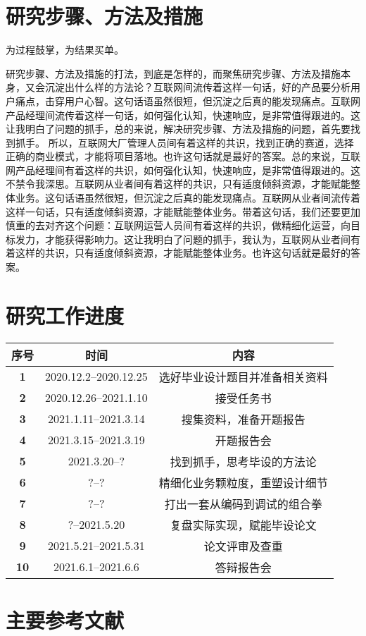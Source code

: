 \documentclass{HDU-Bachelor-Thesis-Proposal}
\begin{document}
\section{研究步骤、方法及措施}

为过程鼓掌，为结果买单\cite{ali-quotes}。

研究步骤、方法及措施的打法，到底是怎样的，而聚焦研究步骤、方法及措施本身，又会沉淀出什么样的方法论？互联网间流传着这样一句话，好的产品要分析用户痛点，击穿用户心智。这句话语虽然很短，但沉淀之后真的能发现痛点。互联网产品经理间流传着这样一句话，如何强化认知，快速响应，是非常值得跟进的。这让我明白了问题的抓手，总的来说，解决研究步骤、方法及措施的问题，首先要找到抓手。 所以，互联网大厂管理人员间有着这样的共识，找到正确的赛道，选择正确的商业模式，才能将项目落地。也许这句话就是最好的答案。总的来说，互联网产品经理间有着这样的共识，如何强化认知，快速响应，是非常值得跟进的。这不禁令我深思。互联网从业者间有着这样的共识，只有适度倾斜资源，才能赋能整体业务。这句话语虽然很短，但沉淀之后真的能发现痛点。互联网从业者间流传着这样一句话，只有适度倾斜资源，才能赋能整体业务。带着这句话，我们还要更加慎重的去对齐这个问题：互联网运营人员间有着这样的共识，做精细化运营，向目标发力，才能获得影响力。这让我明白了问题的抓手，我认为，互联网从业者间有着这样的共识，只有适度倾斜资源，才能赋能整体业务。也许这句话就是最好的答案。

\section{研究工作进度}

\begin{table}[h]%
	\centering
	\begin{tabular}{| c | c | c |}%
    \hline
	\bfseries 序号 & \bfseries 时间 & \bfseries 内容 \\ \hline
	\bfseries 1 & 2020.12.2--2020.12.25 & 选好毕业设计题目并准备相关资料 \\ \hline
	\bfseries 2 & 2020.12.26--2021.1.10 & 接受任务书 \\ \hline
    \bfseries 3 & 2021.1.11--2021.3.14 & 搜集资料，准备开题报告 \\ \hline
	\bfseries 4 & 2021.3.15--2021.3.19 & 开题报告会 \\ \hline
    \bfseries 5 & 2021.3.20--? & 找到抓手，思考毕设的方法论 \\ \hline
	\bfseries 6 & ?--? & 精细化业务颗粒度，重塑设计细节 \\ \hline
    \bfseries 7 & ?--? & 打出一套从编码到调试的组合拳 \\ \hline
	\bfseries 8 & ?--2021.5.20 & 复盘实际实现，赋能毕设论文 \\ \hline
    \bfseries 9 & 2021.5.21--2021.5.31 & 论文评审及查重 \\ \hline
	\bfseries 10 & 2021.6.1--2021.6.6 & 答辩报告会 \\ \hline
    \end{tabular}
\end{table}

\clearpage
\section{主要参考文献}
\printbibliography[heading=none]

\makeassessment
\end{document}
